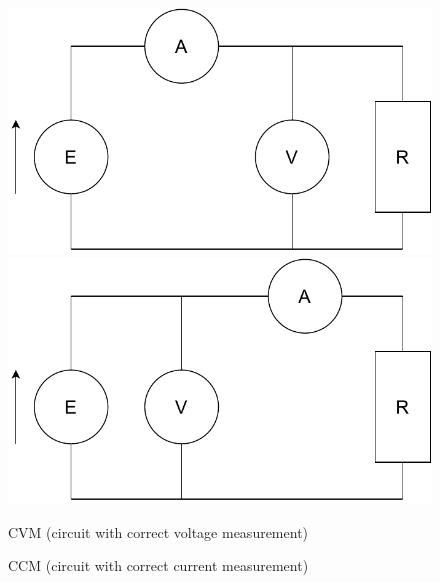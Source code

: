 \begin{figure}[H]
	\centering
	\begin{minipage}{.4\textwidth}
		\centering
		\includegraphics[width=1\linewidth]{schematics/CVM.pdf}
	\end{minipage}\qquad
	\begin{minipage}{.4\textwidth}
		\centering
		\includegraphics[width=1\linewidth]{schematics/CCM.pdf}
	\end{minipage}
	
	\bigskip
	
	\begin{minipage}[t]{.4\textwidth}
		\centering
		
		\caption{CVM (circuit with correct voltage measurement)}
		\label{fig:CVM}
	\end{minipage}\qquad
	\begin{minipage}[t]{.4\textwidth}
		\centering
		\caption{CCM (circuit with correct current measurement)}
		\label{fig:CCM}
	\end{minipage}
\end{figure}

